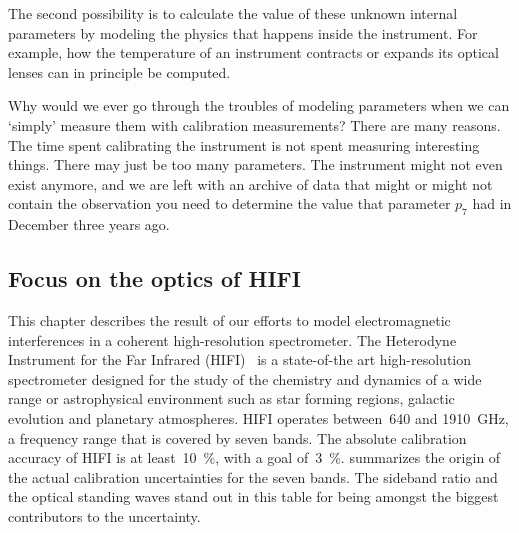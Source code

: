 The second possibility is to calculate the value of these unknown internal parameters by modeling the physics that happens inside the instrument.
For example, how the temperature of an instrument contracts or expands its optical lenses can in principle be computed.

Why would we ever go through the troubles of modeling parameters when we can `simply' measure them with calibration measurements?
There are many reasons.
The time spent calibrating the instrument is not spent measuring interesting things.
There may just be too many parameters.
The instrument might not even exist anymore, and we are left with an archive of data that might or might not contain the observation you need to determine the value that parameter $p_7$ had in December three years ago.

\subsection{Focus on the optics of HIFI}

This chapter describes the result of our efforts to model electromagnetic interferences in a coherent high-resolution spectrometer.
The Heterodyne Instrument for the Far Infrared (HIFI)~\cite{AA_518_L6} is a state-of-the art high-resolution spectrometer designed for the study of the chemistry and dynamics of a wide range or astrophysical environment such as star forming regions, galactic evolution and planetary atmospheres.
HIFI operates between~\num{640} and \SI{1910}{\giga\hertz}, a frequency range that is covered by seven bands.
The absolute calibration accuracy of HIFI is at least~\SI{10}{\percent}, with a goal of~\SI{3}{\percent}.
 summarizes the origin of the actual calibration uncertainties for the seven bands.
The sideband ratio and the optical standing waves stand out in this table for being amongst the biggest contributors to the uncertainty.

